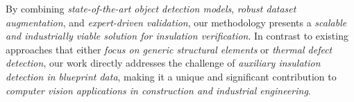 By combining \textit{state-of-the-art object detection models}, \textit{robust dataset augmentation}, and \textit{expert-driven validation}, our methodology presents a \textit{scalable and industrially viable solution for insulation verification}. In contrast to existing approaches that either \textit{focus on generic structural elements} or \textit{thermal defect detection}, our work directly addresses the challenge of \textit{auxiliary insulation detection in blueprint data}, making it a unique and significant contribution to \textit{computer vision applications in construction and industrial engineering}.